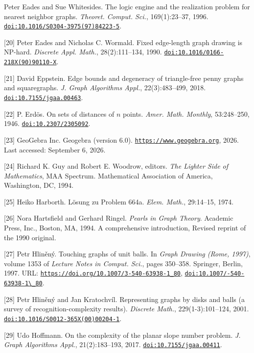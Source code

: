 \documentclass{article}
\begin{document}
\begin{hangpars}
[19] Peter Eades and Sue Whitesides. The logic engine and the realization problem for nearest neighbor graphs. \emph{Theoret. Comput. Sci.}, 169(1):23–37, 1996. \href{https://doi.org/10.1016/S0304-3975(97)84223-5}{\nolinkurl{doi:10.1016/S0304-3975(97)84223-5}}.

[20] Peter Eades and Nicholas C. Wormald. Fixed edge-length graph drawing is NP-hard. \emph{Discrete Appl. Math.}, 28(2):111–134, 1990. \href{https://doi.org/10.1016/0166-218X(90)90110-X}{\nolinkurl{doi:10.1016/0166-218X(90)90110-X}}.

[21] David Eppstein. Edge bounds and degeneracy of triangle-free penny graphs and squaregraphs. \emph{J. Graph Algorithms Appl.}, 22(3):483–499, 2018. \href{https://doi.org/10.7155/jgaa.00463}{\nolinkurl{doi:10.7155/jgaa.00463}}.

[22] P. Erdös. On sets of distances of $n$ points. \emph{Amer. Math. Monthly}, 53:248–250, 1946. \href{https://doi.org/10.2307/2305092}{\nolinkurl{doi:10.2307/2305092}}.

[23] GeoGebra Inc. Geogebra (version 6.0). \href{https://www.geogebra.org}{\nolinkurl{https://www.geogebra.org}}, 2026. Last accessed: September 6, 2026.

[24] Richard K. Guy and Robert E. Woodrow, editors. \emph{The Lighter Side of Mathematics}, MAA Spectrum. Mathematical Association of America, Washington, DC, 1994.

[25] Heiko Harborth. Lösung zu Problem 664a. \emph{Elem. Math.}, 29:14–15, 1974.

[26] Nora Hartsfield and Gerhard Ringel. \emph{Pearls in Graph Theory}. Academic Press, Inc., Boston, MA, 1994. A comprehensive introduction, Revised reprint of the 1990 original.

[27] Petr Hliněný. Touching graphs of unit balls. In \emph{Graph Drawing (Rome, 1997)}, volume 1353 of \emph{Lecture Notes in Comput. Sci.}, pages 350–358. Springer, Berlin, 1997. URL: \href{https://doi.org/10.1007/3-540-63938-1_80}{\nolinkurl{https://doi.org/10.1007/3-540-63938-1_80}}, \href{https://doi.org/10.1007/3-540-63938-1_80}{\texttt{doi:10.1007/-540-63938-1\textbackslash\_80}}.

[28] Petr Hliněný and Jan Kratochvíl. Representing graphs by disks and balls (a survey of recognition-complexity results). \emph{Discrete Math.}, 229(1-3):101–124, 2001. \href{https://doi.org/10.1016/S0012-365X(00)00204-1}{\nolinkurl{doi:10.1016/S0012-365X(00)00204-1}}.

[29] Udo Hoffmann. On the complexity of the planar slope number problem. \emph{J. Graph Algorithms Appl.}, 21(2):183–193, 2017. \href{https://doi.org/10.7155/jgaa.00411}{\nolinkurl{doi:10.7155/jgaa.00411}}.


\end{hangpars}
\end{document}
